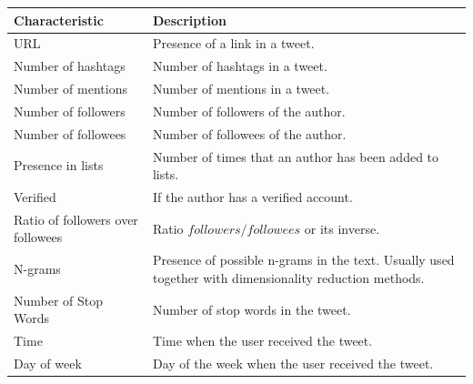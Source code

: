 \begin{table}[htbp]
	\centering
	\tabcolsep=0.11cm
	\singlespacing
	\fontsize{9pt}{10pt}\selectfont
	\begin{tabular}{|>{\raggedright\centering\arraybackslash}m{4cm}|m{11cm}|}
		\hline
		\textbf{Characteristic} & \centering\arraybackslash \textbf{Description} \\ \hline
		URL 																								& Presence of a link in a tweet. \cite{Artzi2012,Comarela2012,Peng2011,Petrovic2011,Suh2010} \\ \hline
		Number of hashtags 																	& Number of hashtags in a tweet. \cite{Artzi2012,Comarela2012,Peng2011,Petrovic2011} \\ \hline
		Number of mentions 																	& Number of mentions in a tweet. \cite{Artzi2012,Comarela2012,Liu2013,Peng2011,Petrovic2011,Suh2010} \\ \hline
		Number of followers 																& Number of followers of the author. \cite{Artzi2012,Hong2011,Liu2013,Luo2013,Petrovic2011,Suh2010,Wang2012} \\ \hline
		Number of followees 																& Number of followees of the author. \cite{Artzi2012,Hong2011,Luo2013,Petrovic2011,Suh2010,Wang2012} \\ \hline
		Presence in lists 																	& Number of times that an author has been added to lists. \cite{Luo2013,Petrovic2011} \\ \hline
		Verified 																						& If the author has a verified account. \cite{Luo2013,Petrovic2011} \\ \hline
		Ratio of followers over followees												& Ratio $followers/followees$ or its inverse. \cite{Artzi2012,Peng2011} \\ \hline
		N-grams 																						& Presence of possible n-grams in the text. Usually used together with dimensionality reduction methods. \cite{Artzi2012,Petrovic2011} \\ \hline
		Number of Stop Words 																& Number of stop words in the tweet. \cite{Artzi2012} \\ \hline
		Time 																								& Time when the user received the tweet. \cite{Artzi2012,Liu2013} \\ \hline
		Day of week 																				& Day of the week when the user received the tweet. \cite{Artzi2012} \\ \hline

\end{tabular}
\end{table}
